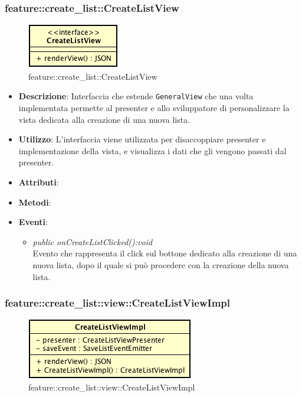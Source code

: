 \subsubsection{feature::create\_list::CreateListView}

\label{feature::create_list::CreateListView}
\begin{figure}[H]
	\centering
	\includegraphics[scale=0.5]{Sezioni/SottosezioniST/img/app/CreateListView.png}
	\caption{feature::create\_list::CreateListView}
\end{figure}

\begin{itemize}
\item \textbf{Descrizione}: Interfaccia che estende \texttt{GeneralView} che una volta implementata permette al presenter e allo sviluppatore di personalizzare la vista dedicata alla creazione di una nuova lista.
\item \textbf{Utilizzo}: L'interfaccia viene utilizzata per disaccoppiare presenter e implementazione della vista, e visualizza i dati che gli vengono passati dal presenter.
\item \textbf{Attributi}:
\item \textbf{Metodi}:
\item \textbf{Eventi}:
	\begin{itemize}
	\item \textit{public onCreateListClicked():void}\\
	Evento che rappresenta il click sul bottone dedicato alla creazione di una nuova lista, dopo il quale si può procedere con la creazione della nuova lista.
	\end{itemize}
\end{itemize}

\subsubsection{feature::create\_list::view::CreateListViewImpl}

\label{feature::create_list::view::CreateListViewImpl}
\begin{figure}[H]
	\centering
	\includegraphics[scale=0.5]{Sezioni/SottosezioniST/img/app/CreateListViewImpl.png}
	\caption{feature::create\_list::view::CreateListViewImpl}
\end{figure}

